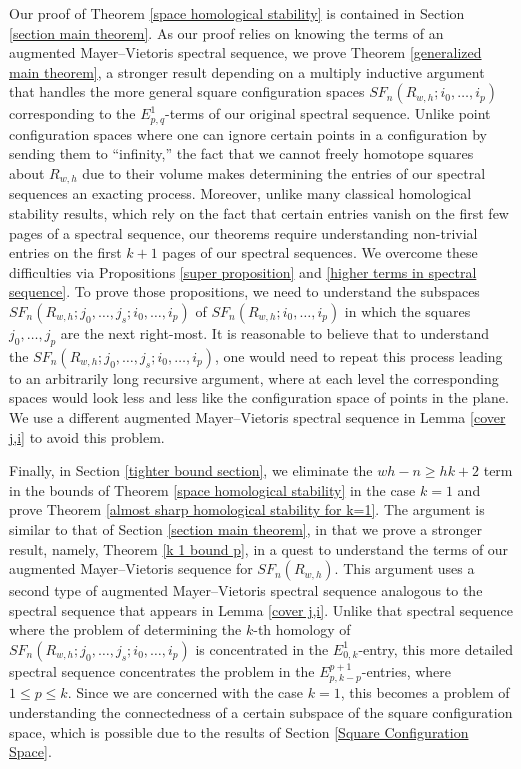 \documentclass[pagebackref,colorlinks,citecolor=blue,linkcolor=blue,urlcolor=blue,filecolor=blue]{article}
\theoremstyle{definition}\newtheorem{definition}[thm]{Definition}
\theoremstyle{definition}
\begin{document}
Our proof of Theorem \ref{space homological stability} is contained in Section \ref{section main theorem}.
As our proof relies on knowing the terms of an augmented Mayer--Vietoris spectral sequence, we prove Theorem \ref{generalized main theorem}, a stronger result depending on a multiply inductive argument that handles the more general square configuration spaces $SF_{n}(R_{w,h}; i_{0}, \dots, i_{p})$ corresponding to the $E^{1}_{p,q}$-terms of our original spectral sequence.
Unlike point configuration spaces where one can ignore certain points in a configuration by sending them to ``infinity,'' the fact that we cannot freely homotope squares about $R_{w,h}$ due to their volume makes determining the entries of our spectral sequences an exacting process.
Moreover, unlike many classical homological stability results, which rely on the fact that certain entries vanish on the first few pages of a spectral sequence, our theorems require understanding non-trivial entries on the first $k+1$ pages of our spectral sequences.
We overcome these difficulties via Propositions \ref{super proposition} and \ref{higher terms in spectral sequence}.
To prove those propositions, we need to understand the subspaces $SF_{n}(R_{w,h}; j_{0},\dots, j_{s}; i_{0},\dots, i_{p})$ of $SF_{n}(R_{w,h}; i_{0},\dots, i_{p})$ in which the squares $j_{0},\dots, j_{p}$ are the next right-most.
It is reasonable to believe that to understand the $SF_{n}(R_{w,h}; j_{0},\dots, j_{s}; i_{0},\dots, i_{p})$, one would need to repeat this process leading to an arbitrarily long recursive argument, where at each level the corresponding spaces would look less and less like the configuration space of points in the plane.
We use a different augmented Mayer--Vietoris spectral sequence in Lemma \ref{cover j,i} to avoid this problem.

Finally, in Section \ref{tighter bound section}, we eliminate the $wh-n\ge hk+2$ term in the bounds of Theorem \ref{space homological stability} in the case $k=1$ and prove Theorem \ref{almost sharp homological stability for k=1}.
The argument is similar to that of Section \ref{section main theorem}, in that we prove a stronger result, namely, Theorem \ref{k 1 bound p}, in a quest to understand the terms of our augmented Mayer--Vietoris sequence for $SF_{n}(R_{w,h})$.
This argument uses a second type of augmented Mayer--Vietoris spectral sequence analogous to the spectral sequence that appears in Lemma \ref{cover j,i}.
Unlike that spectral sequence where the problem of determining the $k$-th homology of $SF_{n}(R_{w,h}; j_{0},\dots, j_{s}; i_{0},\dots, i_{p})$ is concentrated in the $E^{1}_{0,k}$-entry, this more detailed spectral sequence concentrates the problem in the $E^{p+1}_{p, k-p}$-entries, where $1\le p\le k$.
Since we are concerned with the case $k=1$, this becomes a problem of understanding the connectedness of a certain subspace of the square configuration space, which is possible due to the results of Section \ref{Square Configuration Space}.
\end{document}
